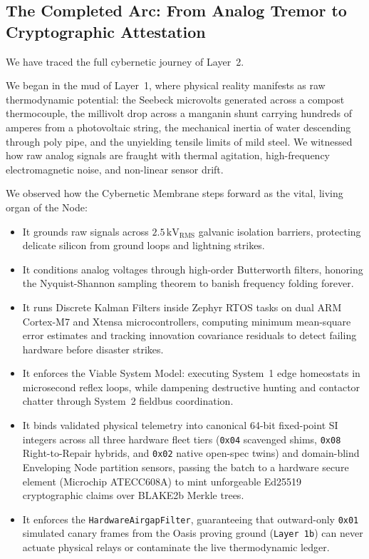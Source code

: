 \subsection{The Completed Arc: From Analog Tremor to Cryptographic Attestation}

We have traced the full cybernetic journey of Layer~2. 

We began in the mud of Layer~1, where physical reality manifests as raw thermodynamic potential: the Seebeck microvolts generated across a compost thermocouple, the millivolt drop across a manganin shunt carrying hundreds of amperes from a photovoltaic string, the mechanical inertia of water descending through poly pipe, and the unyielding tensile limits of mild steel. We witnessed how raw analog signals are fraught with thermal agitation, high-frequency electromagnetic noise, and non-linear sensor drift.

We observed how the Cybernetic Membrane steps forward as the vital, living organ of the Node:
\begin{itemize}
    \item It grounds raw signals across $2.5\,\mathrm{kV}_{\mathrm{RMS}}$ galvanic isolation barriers, protecting delicate silicon from ground loops and lightning strikes.
    \item It conditions analog voltages through high-order Butterworth filters, honoring the Nyquist-Shannon sampling theorem to banish frequency folding forever.
    \item It runs Discrete Kalman Filters inside Zephyr RTOS tasks on dual ARM Cortex-M7 and Xtensa microcontrollers, computing minimum mean-square error estimates and tracking innovation covariance residuals to detect failing hardware before disaster strikes.
    \item It enforces the Viable System Model: executing System~1 edge homeostats in microsecond reflex loops, while dampening destructive hunting and contactor chatter through System~2 fieldbus coordination.
    \item It binds validated physical telemetry into canonical 64-bit fixed-point SI integers across all three hardware fleet tiers (\texttt{0x04} scavenged shims, \texttt{0x08} Right-to-Repair hybrids, and \texttt{0x02} native open-spec twins) and domain-blind Enveloping Node partition sensors, passing the batch to a hardware secure element (Microchip ATECC608A) to mint unforgeable Ed25519 cryptographic claims over BLAKE2b Merkle trees.
    \item It enforces the \texttt{HardwareAirgapFilter}, guaranteeing that outward-only \texttt{0x01} simulated canary frames from the Oasis proving ground (\texttt{Layer 1b}) can never actuate physical relays or contaminate the live thermodynamic ledger.
\end{itemize}

